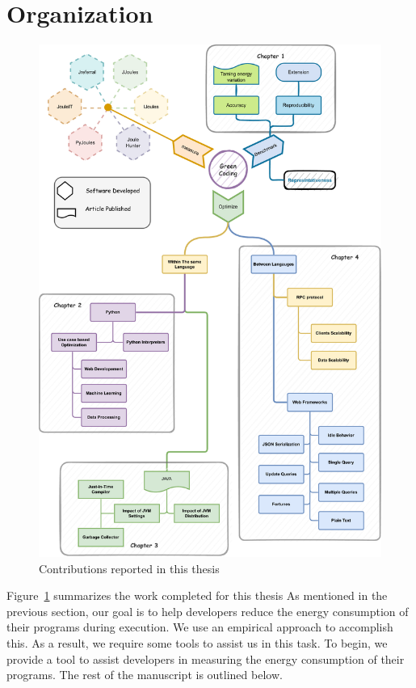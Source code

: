 \section{Organization}
\begin{figure}[!h]
    \centering
    \includegraphics[width=.7\textwidth,height=\textheight,keepaspectratio]{chapters/thesis_contributions.pdf}
    \caption{Contributions reported in this thesis}
    \label{fig:thesis_contributions}
\end{figure}

Figure~\ref{fig:thesis_contributions} summarizes the work completed for this thesis As mentioned in the previous section, our goal is to help developers reduce the energy consumption of their programs during execution.
We use an empirical approach to accomplish this.
As a result, we require some tools to assist us in this task.
To begin, we provide a tool to assist developers in measuring the energy consumption of their programs.
The rest of the manuscript is outlined below.

